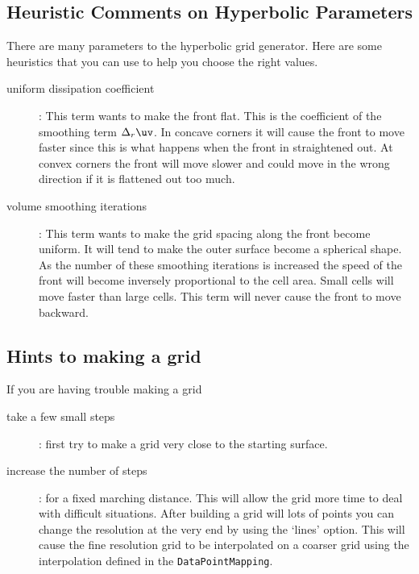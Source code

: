 

\subsection{Heuristic Comments on Hyperbolic Parameters}

There are many parameters to the hyperbolic grid generator. 
Here are some heuristics that you can use to help you choose the right values.
\begin{description}
  \item[uniform dissipation coefficient] : This term wants to make the front flat.
     This is the coefficient of the smoothing term $\Delta_r \uv$.
     In concave corners it will cause the front to move
     faster since this is what happens when the front in straightened out. At convex corners the
     front will move slower and could move in the wrong direction if it is flattened out too much.
  \item[volume smoothing iterations] : This term wants to make the grid spacing along the front
     become uniform. It will tend to make the outer surface become a spherical shape.
      As the number of these smoothing iterations is increased
     the speed of the front will become inversely proportional to the cell area. Small cells will move
     faster than large cells. This term will never cause the front to move backward.
\end{description}

\subsection{Hints to making a grid}

If you are having trouble making a grid
\begin{description}
  \item[take a few small steps] : first try to make a grid very close to the starting surface. 
  \item[increase the number of steps] : for a fixed marching distance. This will allow the grid 
     more time to deal with difficult situations. After building a grid will lots of points 
     you can change the resolution at the very end by using the `lines' option. This will cause
     the fine resolution grid to be interpolated on a coarser grid using the interpolation
     defined in the {\tt DataPointMapping}.
\end{description}



